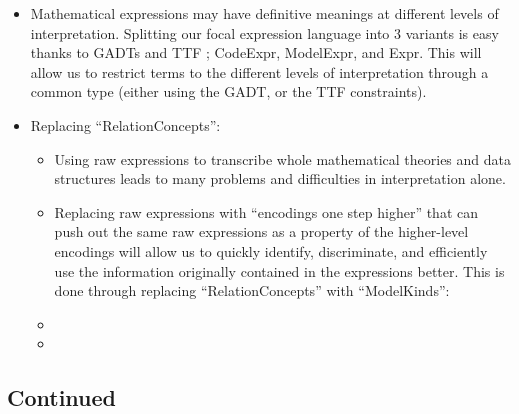 \begin{itemize}

	\item Mathematical expressions may have definitive meanings at different
	      levels of interpretation. Splitting our focal expression language into
	      3 variants is easy thanks to GADTs and TTF \cite{carette2009finally};
	      CodeExpr, ModelExpr, and Expr. This will allow us to restrict terms to
	      the different levels of interpretation through a common type (either
	      using the GADT, or the TTF constraints).

	\item Replacing ``RelationConcepts'':

	      \begin{itemize}

		      \item Using raw expressions to transcribe whole mathematical
		            theories and data structures leads to many problems and
		            difficulties in interpretation alone.

		      \item Replacing raw expressions with ``encodings one step higher''
		            that can push out the same raw expressions as a property of
		            the higher-level encodings will allow us to quickly
		            identify, discriminate, and efficiently use the information
		            originally contained in the expressions better. This is done
		            through replacing ``RelationConcepts'' with ``ModelKinds'':

			  \item \currentModelKindsHaskell
			  
			  \item {}

	      \end{itemize}

\end{itemize}

\subsection{Continued}

